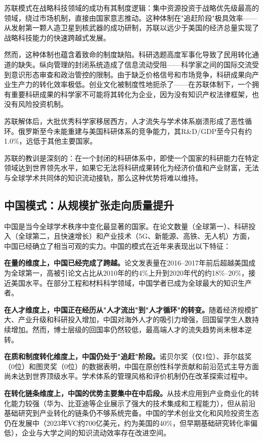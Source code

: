 苏联模式在战略科技领域的成功有其制度逻辑：集中资源投资于战略优先级最高的领域，绕过市场机制，直接由国家意志推动。这种体制在"追赶阶段"极具效率——从发射第一颗人造卫星到核武器的成功研制，苏联以远少于美国的经济总量实现了战略科技能力的快速跨越式发展。

然而，这种体制也蕴含着致命的制度缺陷。科研选题高度军事化导致了民用转化通道的缺失。纵向管理的封闭系统造成了信息流动受阻——科学家之间的国际交流受到意识形态审查和政治管控的限制。由于缺乏价格信号和市场竞争，科研成果向产业生产力的转化效率极低。创业文化被制度性地扼杀了——在苏联体制下，一个拥有重要科研成果的科学家不可能将其转化为企业，因为没有知识产权法律框架，也没有风险投资机制。

苏联解体后，大批优秀科学家移居西方，人才流失与学术体系崩溃形成了恶性循环。俄罗斯至今未能重建与美国科研体系的竞争能力，其R\&D/GDP至今只有约1.0\%，远低于其他主要国家。

苏联的教训是深刻的：在一个封闭的科研体系中，即使一个国家的科研能力在特定领域达到世界领先水平，如果它无法将科研成果转化为经济价值和产业财富，无法与全球学术共同体的知识流动接轨，那么这种优势将难以维持。

\subsection{中国模式：从规模扩张走向质量提升}

中国是当今全球学术秩序中变化最显著的国家。在论文数量（全球第一）、科研投入（全球第二，且快速增长）和产业技术（5G、新能源、高铁、无人机）方面，中国已经确立了相当可观的实力。中国的模式在近年来表现出以下特征：

\textbf{在量的维度上，中国已经完成了跨越。}论文发表量在2016--2017年前后超越美国成为全球第一，高被引论文占比从2010年的约4\%上升到2020年代的约18\%--20\%，接近美国水平。在部分工程和材料科学领域，中国学者已成为全球最大的知识生产者。

\textbf{在人才维度上，中国正在经历从"人才流出"到"人才循环"的转变。}随着经济规模扩大、产业升级和科研投入增加，中国对海外人才的吸引力增强，回国留学生人数持续增加。然而，博士层级的回国率仍然较低，最高端人才的流失趋势尚未根本逆转。

\textbf{在质和制度转化维度上，中国仍处于"追赶"阶段。}诺贝尔奖（仅1位）、菲尔兹奖（0位）和图灵奖（0位）的数据表明，中国在原创性科学贡献和前沿范式主导方面尚未达到世界顶级水平。学术体系的管理风格和评价机制仍在改革探索过程中。

\textbf{在转化链条维度上，中国的优势主要集中在中后段。}从技术应用到产业商业化的转化能力较强（华为、比亚迪等企业展示了强大的技术集成和工程能力），但从前沿基础研究到产业转化的链条仍不够系统完备。中国的学术创业文化和风险投资生态仍在发展中（2023年VC约700亿美元，约为美国的40\%，但早期基础研究转化率偏低），企业与大学之间的知识流动效率存在改进空间。

